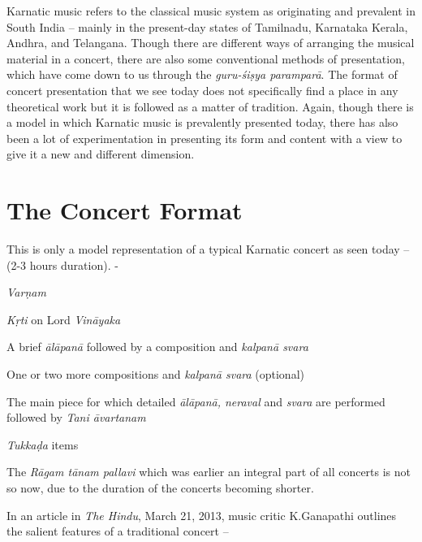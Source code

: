 Karnatic music refers to the classical music system as originating and prevalent in South India – mainly in the present-day states of Tamilnadu, Karnataka Kerala, Andhra, and Telangana. Though there are different ways of arranging the musical material in a concert, there are also some conventional methods of presentation, which have come down to us through the \textit{guru-śiṣya paramparā}. The format of concert presentation that we see today does not specifically find a place in any theoretical work but it is followed as a matter of tradition. Again, though there is a model in which Karnatic music is prevalently presented today, there has also been a lot of experimentation in presenting its form and content with a view to give it a new and different dimension.

\vspace{-.4cm}

\section*{The Concert Format}

This is only a model representation of a typical Karnatic concert as seen today – (2-3 hours duration). -

\textit{Varṇam}

\textit{Kṛti} on Lord \textit{Vināyaka}

A brief \textit{ālāpanā} followed by a composition and \textit{kalpanā svara}

One or two more compositions and \textit{kalpanā svara} (optional)

The main piece for which detailed \textit{ālāpanā, neraval} and \textit{svara} are performed followed by \textit{Tani āvartanam}

\textit{Tukkaḍa} items

The \textit{Rāgam tānam pallavi} which was earlier an integral part of all concerts is not so now, due to the duration of the concerts becoming shorter.

In an article in \textit{The Hindu}, March 21, 2013, music critic K.Ganapathi outlines the salient features of a traditional concert –

